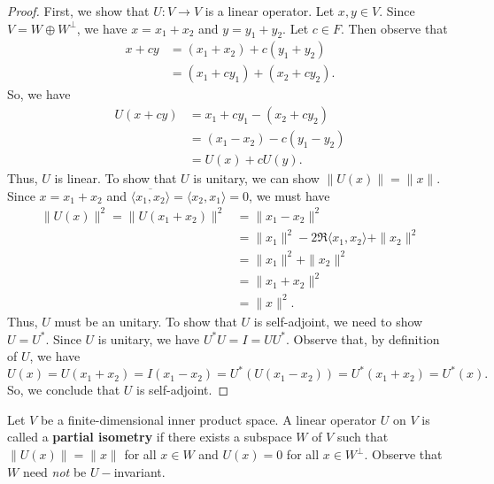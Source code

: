 \begin{proof}
First, we show that \( U: V \to V  \) is a linear operator. Let \( x,y \in V  \). Since \( V = W \oplus W^{\perp} \), we have \( x = {x}_{1} + {x}_{2} \) and \( y = {y}_{1} + {y}_{2} \). Let \( c \in F  \). Then observe that
\begin{align*}
    x + cy &= ({x}_{1} + {x}_{2}) + c ({y}_{1} + {y}_{2})  \\
           &= ({x}_{1} + {cy}_{1}) + ({x }_{2} + {cy}_{2}).
\end{align*}
So, we have
\begin{align*}
    U(x + cy) &= {x}_{1} + {cy}_{1} - ({x}_{2} + {cy}_{2})  \\
              &= ({x}_{1} - {x}_{2}) - c({y}_{1} -{y}_{2}) \\
              &= U(x) + c U(y).
\end{align*}
Thus, \( U  \) is linear. To show that \( U  \) is unitary, we can show \( \|U(x)\| = \|x\|  \). Since \( x =  {x}_{1} + {x}_{2}  \) and \( \overline{\langle {x}_{1} , {x}_{2} \rangle} =  \langle {x}_{2} , {x}_{1} \rangle = 0  \), we must have
\begin{align*}
    \|U(x)\|^{2} = \|U({x}_{1} + {x}_{2})\|^{2} &= \|{x}_{1} - {x}_{2}\|^{2}  \\
                                                &= \|{x}_{1}\|^{2} - 2\Re \langle {x}_{1} , {x}_{2} \rangle + \|{x}_{2}\|^{2} \\ 
                                                &= \|{x}_{1}\|^{2} + \|{x}_{2}\|^{2} \\
                                                &= \|{x}_{1} + {x}_{2}\|^{2} \\
                                                &= \|x\|^{2}.
\end{align*}
Thus, \( U  \) must be an unitary. To show that \( U  \) is self-adjoint, we need to show \( U = U^{*} \). Since \( U  \) is unitary, we have \( U^{*}U = I = U U^{*} \). Observe that, by definition of \( U  \), we have
\[  U(x) = U({x}_{1} + {x}_{2}) = I({x}_{1} - {x}_{2}) = U^{*}(U({x}_{1} - {x}_{2})) = U^{*}({x}_{1} + {x}_{2}) = U^{*}(x). \]
So, we conclude that \( U  \) is self-adjoint.
\end{proof}

\begin{definition}
    Let \( V  \) be a finite-dimensional inner product space. A linear operator \( U  \) on \( V  \) is called a \textbf{partial isometry} if there exists a subspace \( W  \) of \( V  \) such that \( \|U(x)\| = \|x\| \) for all \( x \in W  \) and \( U(x) = 0  \) for all \( x \in W^{\perp} \). Observe that \( W  \) need \textit{not} be \( U- \)invariant. 
\end{definition}

